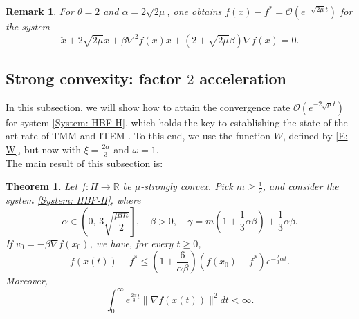 \documentclass[pdflatex,sn-mathphys-num]{sn-jnl}
\theoremstyle{thmstyleone}
\newtheorem{theorem}{Theorem}
\theoremstyle{thmstyletwo}
\newtheorem{remark}{Remark}
\theoremstyle{thmstylethree}
\begin{document}
\begin{remark} 
For $\theta = 2$ and $\alpha=2\sqrt{2\mu}$, one obtains $f(x) - f^* = \mathcal{O}\left( e^{-\sqrt{2\mu} t} \right)$ for the system 
$$\ddot{x} + 2\sqrt{2\mu}\dot{x} + \beta\nabla^2 f(x) \dot{x} + \left( 2 + \sqrt{2\mu}\beta \right) \nabla f(x) = 0.$$    
\end{remark}




\subsection{ Strong convexity: factor \texorpdfstring{$2$}{} acceleration } \label{SS:factor2}
In this subsection, we will show how to attain the convergence rate $\mathcal{O}\left( e^{-2\sqrt{\mu} t} \right)$ for system \eqref{System: HBF-H}, which holds the key to establishing the state-of-the-art rate of TMM \cite{Scoy_2018} and ITEM \cite{Taylor_2023_optimal}. To this end, we use the function $W$, defined by \eqref{E: W}, but now with $\xi=\frac{2\alpha}{3}$ and $\omega=1$. \\

The main result of this subsection is:   

\begin{theorem}
Let $f:H\to\mathbb{R}$ be $\mu$-strongly convex. Pick $m\ge \frac{1}{2}$, and consider the system \eqref{System: HBF-H}, where
$$\alpha\in \left(0,\, 3\sqrt{\frac{\mu m}{2}} \right],\quad \beta > 0,\quad \gamma = m\left( 1 + \frac{1}{3}\alpha\beta \right) + \frac{1}{3}\alpha\beta.$$
If $v_0 = -\beta\nabla f(x_0)$, we have, for every $t\ge 0$,
$$f\left( x(t) \right) - f^* \le \left( 1 + \frac{6}{\alpha\beta} \right) \left( f(x_0) - f^* \right) e^{-\frac{2}{3}\alpha t}.$$
Moreover,
$$ \int_0^{\infty} e^{\frac{2\alpha}{3}t}\| \nabla f\left(x(t)\right) \|^2 dt < \infty. $$
\end{theorem}
\end{document}
